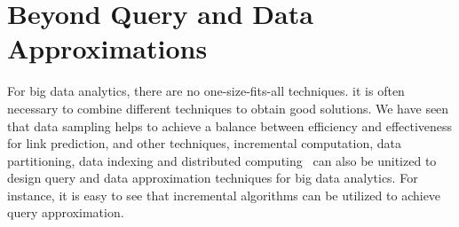 \section{Beyond Query and Data Approximations}
\label{sec-beyond}
 
  For big data analytics, there are no one-size-fits-all techniques.  it is often necessary to combine different techniques to obtain good solutions.
We have seen that data sampling helps to achieve a balance between efficiency and effectiveness for link prediction,
and other techniques, \eg incremental computation, data partitioning, data indexing and distributed computing~\cite{MaLHLH16} can
also be unitized to  design query and data approximation techniques for big data analytics. 
For instance, it is easy to see that incremental algorithms can be utilized to achieve query approximation.


 
